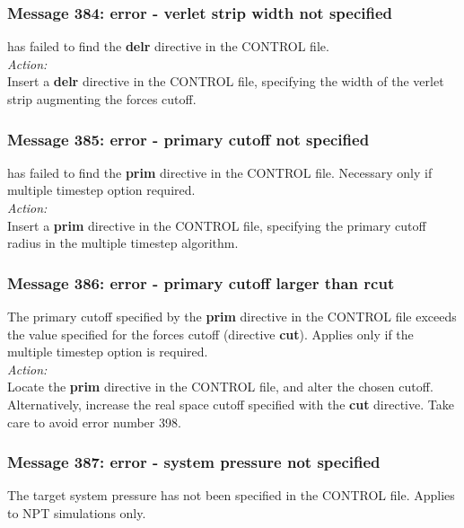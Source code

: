 \subsubsection*{Message 384: error - verlet strip width not specified}

\D{} has failed to find the {\bf delr} directive in the CONTROL file.\\

\noindent
{\em Action:} \\ 
Insert a {\bf delr} directive in the CONTROL file, specifying the
width of the verlet strip augmenting the forces cutoff.

\subsubsection*{Message 385: error - primary cutoff not specified}

\D{} has failed to find the {\bf prim} directive in the CONTROL
file. Necessary only if multiple timestep  option required. \\

\noindent
{\em Action:} \\ 
Insert a {\bf prim} directive in the CONTROL file, specifying the
primary cutoff radius in the multiple timestep
algorithm.

\subsubsection*{Message 386: error - primary cutoff larger than rcut}

The primary cutoff specified by the {\bf prim} directive in the
CONTROL file exceeds the value specified for the forces cutoff
(directive {\bf cut}). Applies only if the multiple
timestep option
is required.\\

\noindent
{\em Action:} \\ 
Locate the {\bf prim} directive in the CONTROL file, and alter the
chosen cutoff. Alternatively, increase the real space cutoff specified
with the {\bf cut} directive. Take care to avoid error number 398.

\subsubsection*{Message 387: error - system pressure not specified}

The target system pressure has not been specified in the CONTROL file.
Applies to NPT simulations only. \\

